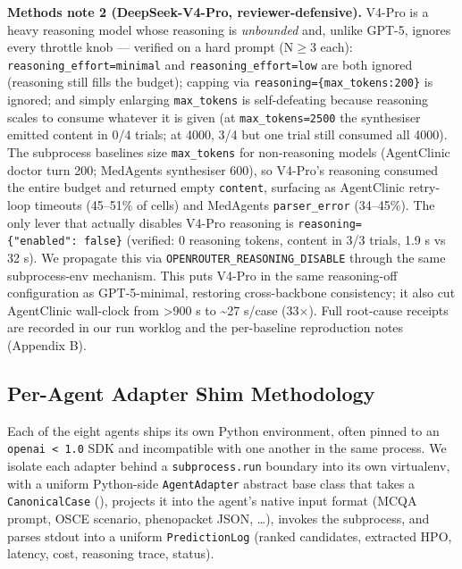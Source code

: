 \textbf{Methods note 2 (DeepSeek-V4-Pro, reviewer-defensive).} V4-Pro is a heavy
reasoning model whose reasoning is \emph{unbounded} and, unlike GPT-5, ignores every
throttle knob --- verified on a hard prompt (N\ensuremath{\geq}3 each): \texttt{reasoning\_effort=minimal}
and \texttt{reasoning\_effort=low} are both ignored (reasoning still fills the budget);
capping via \texttt{reasoning=\{max\_tokens:200\}} is ignored; and simply enlarging
\texttt{max\_tokens} is self-defeating because reasoning scales to consume whatever it
is given (at \texttt{max\_tokens=2500} the synthesiser emitted content in 0/4 trials;
at 4000, 3/4 but one trial still consumed all 4000). The subprocess baselines
size \texttt{max\_tokens} for non-reasoning models (AgentClinic doctor turn 200;
MedAgents synthesiser 600), so V4-Pro's reasoning consumed the entire budget
and returned empty \texttt{content}, surfacing as AgentClinic retry-loop timeouts
(45--51\% of cells) and MedAgents \texttt{parser\_error} (34--45\%). The only lever that
actually disables V4-Pro reasoning is \texttt{reasoning=\{"enabled":\ false\}} (verified:
0 reasoning tokens, content in 3/3 trials, 1.9 s vs 32 s). We propagate this
via \texttt{OPENROUTER\_REASONING\_DISABLE} through the same subprocess-env mechanism. This puts
V4-Pro in the same reasoning-off configuration as GPT-5-minimal, restoring
cross-backbone consistency; it also cut AgentClinic wall-clock from \textgreater900 s to
\textasciitilde27 s/case (33\ensuremath{\times}). Full root-cause receipts are recorded in our run worklog
and the per-baseline reproduction notes (Appendix B).

\subsection{Per-Agent Adapter Shim Methodology}\label{sec-5-3}

Each of the eight agents ships its own Python environment, often pinned to
an \texttt{openai\ \textless{}\ 1.0} SDK and incompatible with one another in the same process.
We isolate each adapter behind a \texttt{subprocess.run} boundary into its own
virtualenv, with a uniform Python-side \texttt{AgentAdapter}
abstract base class that takes a
\texttt{CanonicalCase} (), projects it into the agent's native input format
(MCQA prompt, OSCE scenario, phenopacket JSON, \ldots), invokes the subprocess,
and parses stdout into a uniform \texttt{PredictionLog} (ranked candidates,
extracted HPO, latency, cost, reasoning trace, status).

